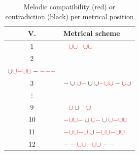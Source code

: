 \documentclass[twoside]{article}
\newcommand{\longa}{-}        %
\newcommand{\brevis}{\cup}    %
\begin{document}
\begin{table}[ht]
    \centering
    \begin{tabular}{c l}
        \hline
        V. & Metrical scheme \\
        \hline
        1 & $\textcolor{red}{\longa}\textcolor{red}{\brevis}\textcolor{red}{\brevis}\textcolor{red}{\longa}\textcolor{red}{\brevis}\textcolor{red}{\brevis}\textcolor{red}{\longa}$ \\
        
        2 & \makecell[l]{$\longa\textcolor{red}{\longa}\textcolor{red}{\longa}\textcolor{red}{\brevis}\textcolor{red}{\brevis}\textcolor{red}{\longa}$ \textbackslash\\
                           $\brevis\textcolor{red}{\brevis}\textcolor{red}{\longa}\textcolor{red}{\brevis}\textcolor{red}{\brevis}\longa\textcolor{red}{\longa}\textcolor{red}{\longa}\textcolor{red}{\longa}$} \\
        
        3 & $\longa\brevis\textcolor{red}{\brevis}\textcolor{red}{\longa}\brevis\brevis\textcolor{red}{\longa}\textcolor{red}{\brevis}\textcolor{red}{\brevis}\longa\textcolor{red}{\brevis}\textcolor{red}{\brevis}$ \\

        $\vdots$ & \\
        
        9 & $\textcolor{red}{\longa}\textcolor{red}{\brevis}\brevis\textcolor{red}{\longa}\textcolor{red}{\brevis}\longa\textcolor{red}{\longa}$ \\
        
        10 & $\textcolor{red}{\longa}\textcolor{red}{\brevis}\textcolor{red}{\brevis}\textcolor{red}{\longa}\brevis\textcolor{red}{\brevis}\textcolor{red}{\longa}\brevis\textcolor{red}{\brevis}\textcolor{red}{\longa}\textcolor{red}{\brevis}\textcolor{red}{\brevis}$ \\
        
        11 & $\textcolor{red}{\longa}\textcolor{red}{\brevis}\textcolor{red}{\brevis}\textcolor{red}{\longa}\textcolor{red}{\brevis}\brevis\textcolor{red}{\longa}\textcolor{red}{\brevis}\textcolor{red}{\brevis}\textcolor{red}{\longa}\textcolor{red}{\brevis}\textcolor{red}{\brevis}$ \\
        
        12 & $\textcolor{red}{\longa}\longa\textcolor{red}{\brevis}\textcolor{red}{\brevis}\textcolor{red}{\longa}\textcolor{red}{\brevis}\textcolor{red}{\brevis}\longa\textcolor{red}{\longa}$ \\
        \hline
    \end{tabular}
    \caption{Melodic compatibility (red) or contradiction (black) per metrical position}
    \label{tab:clouds-contour-scheme}
\end{table}
\end{document}
